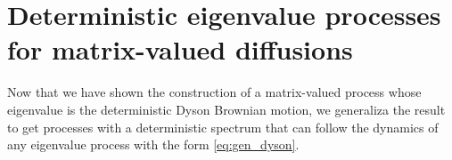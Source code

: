 \section{Deterministic eigenvalue processes for matrix-valued diffusions}

Now that we have shown the construction of a matrix-valued process whose eigenvalue is the deterministic Dyson Brownian motion, we generaliza the result to get processes with a deterministic spectrum that can follow the dynamics of any eigenvalue process with the form \eqref{eq:gen_dyson}.


    
    




